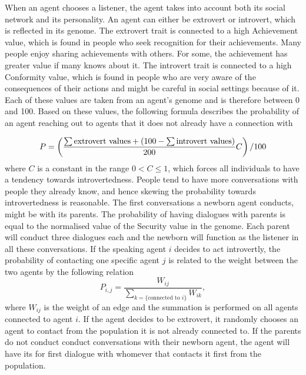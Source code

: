 When an agent chooses a listener, the agent takes into account both its social network and its personality. An agent can either be extrovert or introvert, which is reflected in its genome. The extrovert trait is connected to a high Achievement value, which is found in people who seek recognition for their achievements. Many people enjoy sharing achievements with others. For some, the achievement has greater value if many knows about it. The introvert trait is connected to a high Conformity value, which is found in people who are very aware of the consequences of their actions and might be careful in social settings because of it. Each of these values are taken from an agent’s genome and is therefore between 0 and 100. Based on these values, the following formula describes the probability of an agent reaching out to agents that it does not already have a connection with

\begin{equation}\label{eq:chooseListener}
P = \left( \frac{\sum \text{extrovert values} + (100 - \sum \text{introvert values})}{200}C \right)/100
\end{equation}
where $C$ is a constant in the range $0 < C \leq 1$, which forces all individuals to have a tendency towards introvertedness. People tend to have more conversations with people they already know, and hence skewing the probability towards introvertedness is reasonable. The first conversations a newborn agent conducts, might be with its parents. The probability of having dialogues with parents is equal to the normalised value of the Security value in the genome. Each parent will conduct three dialogues each and the newborn will function as the listener in all these conversations. If the speaking agent $i$ decides to act introvertly, the probability of contacting one specific agent $j$ is related to the weight between the two agents by the following relation
\begin{equation}\label{eq:intrvertListener}
P_{i,j} = \frac{W_{ij}}{\sum_{k=\{\text{connected to } i\}} {W_{ik}}},
\end{equation}
where $W_{ij}$ is the weight of an edge and the summation is performed on all agents connected to agent $i$. If the agent decides to be extrovert, it randomly chooses an agent to contact from the population it is not already connected to. If the parents do not conduct conduct conversations with their newborn agent, the agent will have its for first dialogue with whomever that contacts it first from the population.

